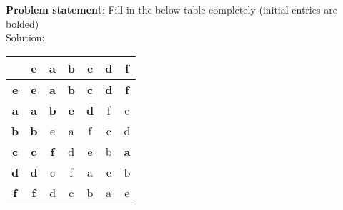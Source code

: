 \documentclass{article} %
\begin{document}
\textbf{Problem statement}: Fill in the below table completely (initial entries are bolded)
\\

Solution: 
\begin{addmargin}[1em]{0em}
\begin{tabular} {c | c c c c c c}
                  & \textbf{e} & \textbf{a} & \textbf{b} & \textbf{c} & \textbf{d} & \textbf{f} \\ \hline
\textbf{e} & \textbf{e} & \textbf{a} & \textbf{b} & \textbf{c} & \textbf{d} & \textbf{f} \\
\textbf{a} & \textbf{a} & \textbf{b} & \textbf{e} & \textbf{d} &        f         &        c       \\
\textbf{b} & \textbf{b} &         e         &       a          &         f         &        c          &       d       \\
\textbf{c} & \textbf{c} & \textbf{f}  &        d          &         e         &        b          & \textbf{a} \\
\textbf{d} & \textbf{d} &          c        &       f          &          a        &         e         &       b         \\
\textbf{f} & \textbf{f} &          d        &        c         &            b      &           a       &       e        \\
\end{tabular}
\end{addmargin}

\newpage
\end{document}
